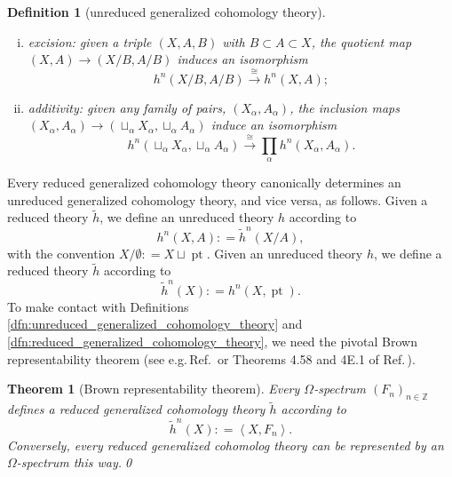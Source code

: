 \documentclass[sort&compress]{elsarticle}
\theoremstyle{theoremstyle}
\newtheorem{thm}[nul]{Theorem}
\theoremstyle{framedtheoremstyle}
\theoremstyle{definitionstyle}
\newtheorem{dfn}[nul]{Definition}%
\theoremstyle{definitionstyle}
\theoremstyle{definitionstyle}
\theoremstyle{definitionstyle}
\theoremstyle{nameddefinitionstyle}
\theoremstyle{framednameddefinitionstyle}
\theoremstyle{proofstyle}
\theoremstyle{definitionstyle}
\newcommand{\fromto}{\rightarrow}
\newcommand{\xfromto}[1]{\xrightarrow{#1}}
\newcommand{\ZZZ}{\mathbb{Z}}
\newcommand{\Top}{\operatorname{\mathbf{Top}}}
\newcommand{\Ab}{\operatorname{\mathbf{Ab}}}
\newcommand{\coloneq}{\mathrel{\mathop:}=}
\newcommand{\isomorphic}{\cong}
\newcommand{\paren}[1]{\left( #1 \right)}
\newcommand{\angles}[1]{\left\langle #1 \right\rangle}
\DeclareMathOperator{\pt}{pt}
\begin{document}
\begin{appendices}
\begin{dfn}[unreduced generalized cohomology theory]
\begin{enumerate}[(i)]
\item excision: given a triple $(X,A,B)$ with $B\subset A \subset X$, the quotient map $\paren{X,A} \fromto \paren{X/B, A/B}$ induces an isomorphism
\begin{equation}
h^n\paren{X/B, A/B} \xfromto{\isomorphic} h^n\paren{X,A};
\end{equation}

\item additivity: given any family of pairs, $(X_\alpha, A_\alpha)$, the inclusion maps $\paren{X_\alpha, A_\alpha} \fromto \paren{\sqcup_\alpha X_\alpha, \sqcup_\alpha A_\alpha}$ induce an isomorphism
\begin{equation}
h^n\paren{ \sqcup_\alpha X_\alpha, \sqcup_\alpha A_\alpha } \xfromto{\isomorphic} \prod_\alpha h^n\paren{X_\alpha, A_\alpha}.
\end{equation}
\end{enumerate}
\end{dfn}


Every reduced generalized cohomology theory canonically determines an unreduced generalized cohomology theory, and vice versa, as follows. Given a reduced theory $\tilde h$, we define an unreduced theory $h$ according to
\begin{equation}
h^n\paren{X, A} \coloneq \tilde h^n\paren{X/A},
\end{equation}
with the convention $X/\emptyset \coloneq X \sqcup \pt$. Given an unreduced theory $h$, we define a reduced theory $\tilde h$ according to
\begin{equation}
\tilde h^n(X) \coloneq h^n(X, \pt).
\end{equation}
To make contact with Definitions\,\ref{dfn:unreduced_generalized_cohomology_theory} and \ref{dfn:reduced_generalized_cohomology_theory}, we need the pivotal Brown representability theorem (see e.g.\,Ref.\,\cite{DavisKirk} or Theorems 4.58 and 4E.1 of Ref.\,\cite{Hatcher}).

\begin{thm}[Brown representability theorem]
Every $\Omega$-spectrum $\paren{F_n}_{n\in \ZZZ}$ defines a reduced generalized cohomology theory $\tilde h$ according to
\begin{equation}
\tilde h^n\paren{X} \coloneq \angles{X, F_n}.
\end{equation}
Conversely, every reduced generalized cohomolog theory can be represented by an $\Omega$-spectrum this way.\label{thm:Brown_representability_theorem}
\qed\end{thm}


\end{appendices}
\end{document}
